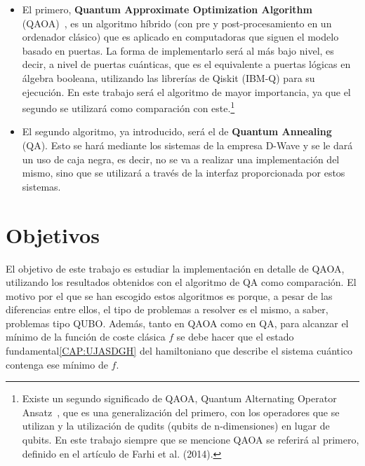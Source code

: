 \begin{itemize}
\item El primero, \textbf{Quantum Approximate Optimization Algorithm} (QAOA)~\cite{qaoa_paper_original}, es un algoritmo híbrido (con pre y post-procesamiento en un ordenador clásico) que es aplicado en computadoras que siguen el modelo basado en puertas.
  La forma de implementarlo será al más bajo nivel, es decir, a nivel de puertas cuánticas, que es el equivalente a puertas lógicas en álgebra booleana, utilizando las librerías de Qiskit (IBM-Q) para su ejecución.
  En este trabajo será el algoritmo de mayor importancia, ya que el segundo se utilizará como comparación con este.\footnote{
    Existe un segundo significado de QAOA, Quantum Alternating Operator Ansatz~\cite{quantum_alternating_operator_ansatz}, que es una generalización del primero, con los operadores que se utilizan y la utilización de qudits (qubits de n-dimensiones) en lugar de qubits.
    En este trabajo siempre que se mencione QAOA se referirá al primero, definido en el artículo de Farhi et al. (2014)\cite{qaoa_paper_original}.
  }

\item El segundo algoritmo, ya introducido, será el de \textbf{Quantum Annealing} (QA).
  Esto se hará mediante los sistemas de la empresa D-Wave y se le dará un uso de caja negra, es decir, no se va a realizar una implementación del mismo, sino que se utilizará a través de la interfaz proporcionada por estos sistemas.
\end{itemize}

\section{Objetivos}

El objetivo de este trabajo es estudiar la implementación en detalle de QAOA, utilizando los resultados obtenidos con el algoritmo de QA como comparación.
El motivo por el que se han escogido estos algoritmos es porque, a pesar de las diferencias entre ellos, el tipo de problemas a resolver es el mismo, a saber, problemas tipo QUBO\@.
Además, tanto en QAOA como en QA, para alcanzar el mínimo de la función de coste clásica $f$ se debe hacer que el estado fundamental\ref{CAP:UJASDGH}  %
del hamiltoniano que describe el sistema cuántico contenga ese mínimo de $f$.



